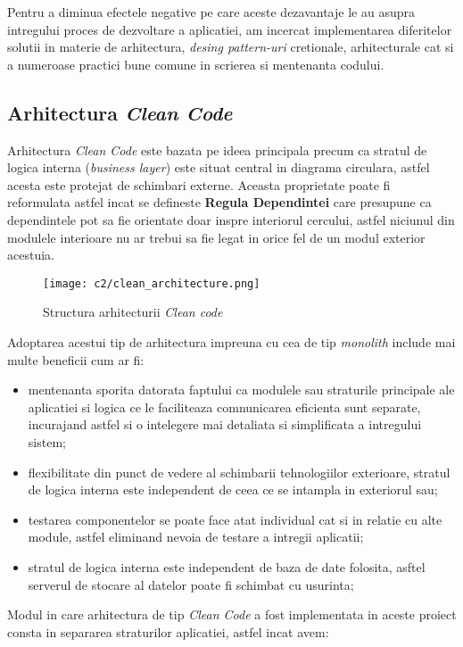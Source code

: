 Pentru a diminua efectele negative pe care aceste dezavantaje le au asupra intregului proces de dezvoltare a aplicatiei, am incercat implementarea diferitelor solutii in materie de arhitectura, \textit{desing pattern-uri} cretionale, arhitecturale cat si a numeroase practici bune comune in scrierea si mentenanta codului.

\subsection*{Arhitectura \textit{Clean Code}}
Arhitectura \textit{Clean Code } este bazata pe ideea principala precum ca stratul de logica interna (\textit{business layer}) este situat central in diagrama circulara, astfel acesta este protejat de schimbari externe. Aceasta proprietate poate fi reformulata astfel incat se defineste \textbf{Regula Dependintei} care presupune ca dependintele pot sa fie orientate doar inspre interiorul cercului, astfel niciunul din modulele interioare nu ar trebui sa fie legat in orice fel de un modul exterior acestuia.

\begin{figure}[h]
	\centering
	
	\texttt{[image: c2/clean\_architecture.png]}
	\caption{Structura arhitecturii \textit{Clean code}}
\end{figure}

Adoptarea acestui tip de arhitectura impreuna cu cea de tip \textit{monolith} include mai multe beneficii cum ar fi:

\begin{itemize}

	\item mentenanta sporita datorata faptului ca modulele sau straturile principale ale aplicatiei si logica ce le faciliteaza comnunicarea eficienta sunt separate, incurajand astfel si o intelegere mai detaliata si simplificata a intregului sistem;
	
	\item flexibilitate din punct de vedere al schimbarii tehnologiilor exterioare, stratul de logica interna este independent de ceea ce se intampla in exteriorul sau;
	
	\item testarea componentelor se poate face atat individual cat si in relatie cu alte module, astfel eliminand nevoia de testare a intregii aplicatii;
	
	\item stratul de logica interna este independent de baza de date folosita, asftel serverul de stocare al datelor poate fi schimbat cu usurinta;

\end{itemize} 
Modul in care arhitectura de tip \textit{Clean Code} a fost implementata in aceste proiect consta in separarea straturilor aplicatiei, astfel incat avem:

